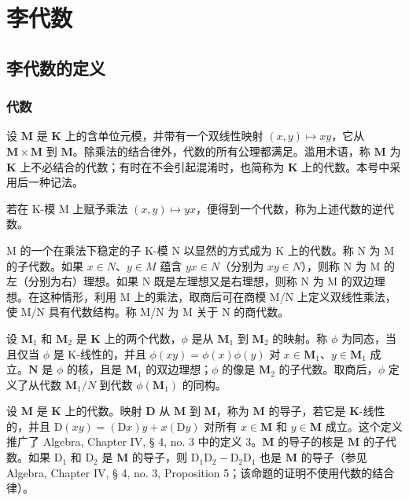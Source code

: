 \chapter{李代数}

\section{李代数的定义}

\subsection{代数}

设 \(\mathbf{M}\) 是 \(\mathbf{K}\) 上的含单位元模，并带有一个双线性映射 \((x,y)\mapsto xy\)，它从 \(\mathbf{M}\times \mathbf{M}\) 到 \(\mathbf{M}\)。除乘法的结合律外，代数的所有公理都满足。滥用术语，称 \(\mathbf{M}\) 为 \(\mathbf{K}\) 上不必结合的代数；有时在不会引起混淆时，也简称为 \(\mathbf{K}\) 上的代数。本号中采用后一种记法。

若在 K-模 M 上赋予乘法 \((x,y)\mapsto yx\)，便得到一个代数，称为上述代数的逆代数。

M 的一个在乘法下稳定的子 K-模 N 以显然的方式成为 K 上的代数。称 N 为 M 的子代数。如果 \(x \in N\)、\(y \in M\) 蕴含 \(yx \in N\)（分别为 \(xy \in N\)），则称 N 为 M 的左（分别为右）理想。如果 N 既是左理想又是右理想，则称 N 为 M 的双边理想。在这种情形，利用 M 上的乘法，取商后可在商模 M/N 上定义双线性乘法，使 M/N 具有代数结构。称 M/N 为 M 关于 N 的商代数。

设 \(\mathbf{M}_1\) 和 \(\mathbf{M}_2\) 是 \(\mathbf{K}\) 上的两个代数，\(\phi\) 是从 \(\mathbf{M}_1\) 到 \(\mathbf{M}_2\) 的映射。称 \(\phi\) 为同态，当且仅当 \(\phi\) 是 K-线性的，并且 \(\phi(xy) = \phi(x)\phi(y)\) 对 \(x\in \mathbf{M}_1\)、\(y\in \mathbf{M}_1\) 成立。\(\mathbf{N}\) 是 \(\phi\) 的核，且是 \(\mathbf{M}_1\) 的双边理想；\(\phi\) 的像是 \(\mathbf{M}_2\) 的子代数。取商后，\(\phi\) 定义了从代数 \(\mathbf{M}_1 / N\) 到代数 \(\phi (\mathbf{M}_1)\) 的同构。

设 \(\mathbf{M}\) 是 \(\mathbf{K}\) 上的代数。映射 \(\mathbf{D}\) 从 \(\mathbf{M}\) 到 \(\mathbf{M}\)，称为 \(\mathbf{M}\) 的导子，若它是 \(\mathbf{K}\)-线性的，并且 \(\mathrm{D}(xy) = (\mathrm{D}x)y + x(\mathrm{D}y)\) 对所有 \(x \in \mathbf{M}\) 和 \(y \in \mathbf{M}\) 成立。这个定义推广了 Algebra, Chapter IV, § 4, no. 3 中的定义 3。\(\mathbf{M}\) 的导子的核是 \(\mathbf{M}\) 的子代数。如果 \(\mathrm{D}_1\) 和 \(\mathrm{D}_2\) 是 \(\mathbf{M}\) 的导子，则 \(\mathrm{D}_1\mathrm{D}_2 - \mathrm{D}_2\mathrm{D}_1\) 也是 \(\mathbf{M}\) 的导子（参见 Algebra, Chapter IV, § 4, no. 3, Proposition 5；该命题的证明不使用代数的结合律）。

